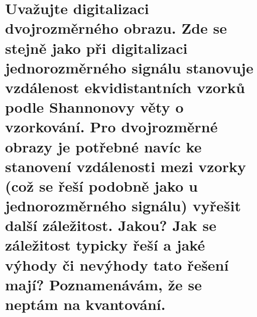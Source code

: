 \section{Uvažujte digitalizaci dvojrozměrného obrazu. Zde se stejně jako při digitalizaci jednorozměrného signálu 
stanovuje vzdálenost ekvidistantních vzorků podle Shannonovy věty o vzorkování. Pro dvojrozměrné obrazy je potřebné 
navíc ke stanovení vzdálenosti mezi vzorky (což se řeší podobně jako u jednorozměrného signálu) vyřešit další 
záležitost. Jakou? Jak se záležitost typicky řeší a jaké výhody či nevýhody tato řešení mají? Poznamenávám, že se neptám 
na kvantování.}